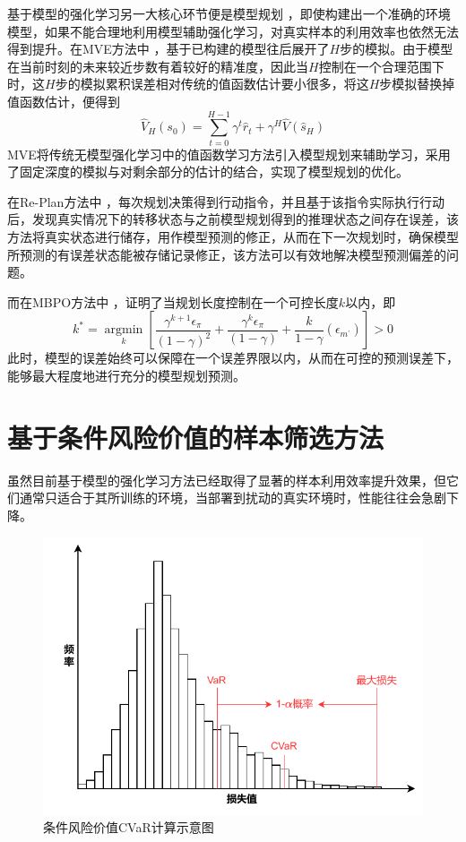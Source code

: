 基于模型的强化学习另一大核心环节便是模型规划 \cite{walsh2010integrating}，即使构建出一个准确的环境模型，如果不能合理地利用模型辅助强化学习，对真实样本的利用效率也依然无法得到提升。在MVE方法中 \cite{feinberg2018model}，基于已构建的模型往后展开了$H$步的模拟。由于模型在当前时刻的未来较近步数有着较好的精准度，因此当$H$控制在一个合理范围下时，这$H$步的模拟累积误差相对传统的值函数估计要小很多，将这$H$步模拟替换掉值函数估计，便得到
\begin{equation}
    \widehat{V}_{H}\left(s_{0}\right)=\sum_{t=0}^{H-1} \gamma^{t} \hat{r}_{t}+\gamma^{H} \widehat{V}\left(\hat{s}_{H}\right)
\end{equation}
MVE将传统无模型强化学习中的值函数学习方法引入模型规划来辅助学习，采用了固定深度的模拟与对剩余部分的估计的结合，实现了模型规划的优化。

在Re-Plan方法中 \cite{williams2017information}，每次规划决策得到行动指令，并且基于该指令实际执行行动后，发现真实情况下的转移状态与之前模型规划得到的推理状态之间存在误差，该方法将真实状态进行储存，用作模型预测的修正，从而在下一次规划时，确保模型所预测的有误差状态能被存储记录修正，该方法可以有效地解决模型预测偏差的问题。

而在MBPO方法中 \cite{janner2019trust}，证明了当规划长度控制在一个可控长度$k$以内，即
\begin{equation}
k^{*}=\underset{k}{\operatorname{argmin}}\left[\frac{\gamma^{k+1} \epsilon_{\pi}}{(1-\gamma)^{2}}+\frac{\gamma^{k} \epsilon_{\pi}}{(1-\gamma)}+\frac{k}{1-\gamma}\left(\epsilon_{m^{\prime}}\right)\right]>0
\end{equation}
此时，模型的误差始终可以保障在一个误差界限以内，从而在可控的预测误差下，能够最大程度地进行充分的模型规划预测。

\section{基于条件风险价值的样本筛选方法}

虽然目前基于模型的强化学习方法已经取得了显著的样本利用效率提升效果，但它们通常只适合于其所训练的环境，当部署到扰动的真实环境时，性能往往会急剧下降。

\begin{figure}
  \centering
  \includegraphics[width=\linewidth]{figures/CVaR.pdf}
  \caption{条件风险价值CVaR计算示意图}
  \label{fig:cvar}
\end{figure}

